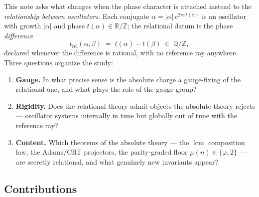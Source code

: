 \documentclass[11pt]{article}
\theoremstyle{plain}
\theoremstyle{definition}
\theoremstyle{remark}
\newcommand{\Q}{\mathbb{Q}}
\newcommand{\Z}{\mathbb{Z}}
\newcommand{\R}{\mathbb{R}}
\DeclareMathOperator{\lcm}{lcm}
\newcommand{\tors}{\Q/\Z}
\begin{document}
This note asks what changes when the phase character is attached instead to the
\emph{relationship between oscillators}. Each conjugate $\alpha=|\alpha|\,
e^{2\pi i\,t(\alpha)}$ is an oscillator with growth $|\alpha|$ and phase
$t(\alpha)\in\R/\Z$; the relational datum is the phase \emph{difference}
\[
t_{\mathrm{rel}}(\alpha,\beta)\;=\;t(\alpha)-t(\beta)\;\in\;\tors ,
\]
declared whenever the difference is rational, with no reference ray anywhere. Three
questions organize the study:
\begin{enumerate}
\item[(i)] \textbf{Gauge.} In what precise sense is the absolute charge a
  gauge-fixing of the relational one, and what plays the role of the gauge group?
\item[(ii)] \textbf{Rigidity.} Does the relational theory admit objects the
  absolute theory rejects --- oscillator systems internally in tune but globally
  out of tune with the reference ray?
\item[(iii)] \textbf{Content.} Which theorems of the absolute theory --- the
  $\lcm$ composition law, the Adams/CRT projectors, the parity-graded floor
  $\mu(n)\in\{\varphi,2\}$ --- are secretly relational, and what genuinely new
  invariants appear?
\end{enumerate}

\subsection{Contributions}
\end{document}
